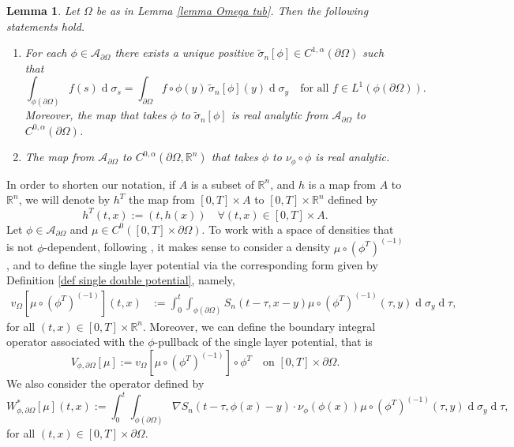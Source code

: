 \documentclass[11pt,reqno,a4paper]{amsart}
\theoremstyle{plain}
\newtheorem{lemma}[theorem]{Lemma}
\theoremstyle{definition}
\newcommand{\R}{\mathbb{R}}
\renewcommand{\d}[1]{\ensuremath{\operatorname{d}\!{#1}}}
\begin{document}
\begin{lemma}\label{lemma change of variable}
    Let $\Omega$ be as in Lemma \ref{lemma Omega tub}. Then the following statements hold.
    \begin{enumerate}
        \item[(i)] For each $\phi \in \mathcal{A}_{\partial\Omega}$ there exists a unique positive $\tilde{\sigma}_n[\phi] \in C^{1,\alpha}(\partial\Omega)$ such that
        \begin{equation*}
            \int_{\phi(\partial\Omega)} f(s) \d \sigma_s = \int_{\partial\Omega} f \circ \phi(y) \,  \tilde{\sigma}_n[\phi](y) \d \sigma_y \quad \text{for all } f \in L^1(\phi(\partial\Omega)).
        \end{equation*}
        Moreover, the map that takes $\phi$ to $\tilde{\sigma}_n[\phi]$ is real analytic from $\mathcal{A}_{\partial\Omega}$ to $C^{0,\alpha}(\partial\Omega)$.

        \item[(ii)] The map from $\mathcal{A}_{\partial\Omega}$ to $C^{0,\alpha}(\partial\Omega, \R^n)$ that takes $\phi$ to $\nu_\phi \circ \phi$ is real analytic.
    \end{enumerate}
\end{lemma}

In order to shorten our notation, if $A$ is a subset of $\R^n$, and $h$ is a map from $A$ to $\R^n$, we will denote by $h^T$ the map from $[0,T] \times A$ to $[0,T] \times \R^n$ defined by
\begin{equation*}
    h^T(t,x) := (t, h(x)) \quad \forall (t,x) \in [0,T] \times A.
\end{equation*}
Let $\phi \in \mathcal{A}_{\partial\Omega}$ and $\mu \in C^0([0,T] \times \partial\Omega)$. To work with a space of densities that is not $\phi$-dependent, following \cite{DaLu23}, it makes sense to consider a density $\mu \circ (\phi^T)^{(-1)}$, and to define the single layer potential via the corresponding form given by Definition \ref{def single double potential}, namely,
\begin{align*}
    v_{\Omega}[\mu \circ (\phi^T)^{(-1)}](t,x) &:= \int_{0}^{t} \int_{\phi(\partial \Omega)} S_n(t-\tau,x-y) \mu \circ (\phi^T)^{(-1)} (\tau, y) \d \sigma_y \d \tau,
\end{align*}
for all $(t,x) \in [0, T] \times \mathbb{R}^n$. Moreover, we can define the boundary integral operator associated with the $\phi$-pullback of the single layer potential, that is 
\begin{equation*}
    V_{\phi,\partial\Omega}[\mu] := v_{\Omega}[\mu \circ (\phi^T)^{(-1)}] \circ \phi^T \quad \text{on } [0, T] \times \partial\Omega.
\end{equation*}
We also consider the operator defined by
\begin{equation*}
    W^\ast_{\phi,\partial\Omega}[\mu](t,x) :=  \int_{0}^{t} \int_{\phi(\partial \Omega)} \nabla S_n(t-\tau, \phi(x) -y) \cdot \nu_\phi(\phi(x)) \mu \circ (\phi^T)^{(-1)} (\tau, y) \d \sigma_y \d \tau,
\end{equation*}
for all $(t,x) \in [0, T] \times \partial\Omega$.
\end{document}
